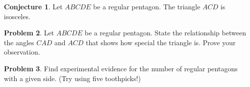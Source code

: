 \documentclass{tufte-handout}
\theoremstyle{definition}
\newtheorem{problem}{Problem}[section]
\newtheorem{conjecture}[problem]{Conjecture}
\begin{document}
\begin{conjecture}\label{conj:regular-pentagon-central-triangle}
Let $ABCDE$ be a regular pentagon. The triangle $ACD$ is isosceles.
\end{conjecture}

\begin{problem}\label{prob:reg-pentagon-angles}
Let $ABCDE$ be a regular pentagon. State the relationship between the angles $CAD$ and $ACD$ that shows how special the triangle is. Prove your observation.
\end{problem}

\begin{problem}\label{prob:reg-pentagon-types}
Find experimental evidence for the number of regular pentagons with a given side. (Try using five toothpicks!)\\[.1in]
\end{problem}
\end{document}
